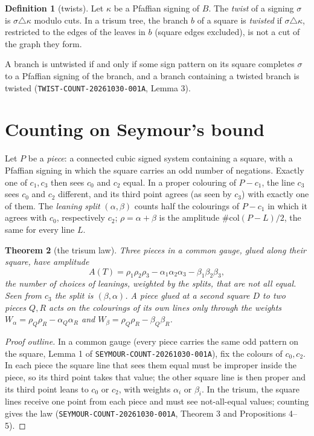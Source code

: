 \documentclass[11pt]{article}
\newtheorem{theorem}{Theorem}
\theoremstyle{definition}
\newtheorem{definition}[theorem]{Definition}
\theoremstyle{remark}
\newcommand{\col}{\#\mathrm{col}}
\begin{document}
\begin{definition}[twists]\label{def:twist}
Let $\kappa$ be a Pfaffian signing of $B$. The \emph{twist} of a signing
$\sigma$ is $\sigma\triangle\kappa$ modulo cuts. In a trisum tree, the branch
$b$ of a square is \emph{twisted} if $\sigma\triangle\kappa$, restricted to the
edges of the leaves in $b$ (square edges excluded), is not a cut of the graph
they form.
\end{definition}
A branch is untwisted if and only if some sign pattern on its square completes
$\sigma$ to a Pfaffian signing of the branch, and a branch containing a
twisted branch is twisted (\texttt{TWIST-COUNT-20261030-001A}, Lemma 3).

\section{Counting on Seymour's bound}\label{sec:A}

Let $P$ be a \emph{piece}: a connected cubic signed system containing a square,
with a Pfaffian signing in which the square carries an odd number of
negations. Exactly one of $c_1,c_3$ then sees $c_0$ and $c_2$ equal. In a proper
colouring of $P-c_1$, the line $c_3$ sees $c_0$ and $c_2$ different, and its
third point agrees (as seen by $c_3$) with exactly one of them. The
\emph{leaning split} $(\alpha,\beta)$ counts half the colourings of $P-c_1$ in
which it agrees with $c_0$, respectively $c_2$; $\rho=\alpha+\beta$ is the
amplitude $\col(P-L)/2$, the same for every line $L$.

\begin{theorem}[the trisum law]\label{thm:law}
Three pieces in a common gauge, glued along their square, have amplitude
\[
A(T)=\rho_1\rho_2\rho_3-\alpha_1\alpha_2\alpha_3-\beta_1\beta_2\beta_3,
\]
the number of choices of leanings, weighted by the splits, that are not all
equal. Seen from $c_3$ the split is $(\beta,\alpha)$. A piece glued at a
second square $D$ to two pieces $Q,R$ acts on the colourings of its own lines
only through the weights $W_\alpha=\rho_Q\rho_R-\alpha_Q\alpha_R$ and
$W_\beta=\rho_Q\rho_R-\beta_Q\beta_R$.
\end{theorem}
\begin{proof}[Proof outline]
In a common gauge (every piece carries the same odd pattern on the square,
Lemma 1 of \texttt{SEYMOUR-COUNT-20261030-001A}), fix the colours of $c_0,c_2$.
In each piece the square line that sees them equal must be improper inside
the piece, so its third point takes that value; the other square line is then
proper and its third point leans to $c_0$ or $c_2$, with weights $\alpha_i$ or
$\beta_i$. In the trisum, the square lines receive one point from each piece
and must see not-all-equal values; counting gives the law
(\texttt{SEYMOUR-COUNT-20261030-001A}, Theorem 3 and Propositions 4--5).
\end{proof}
\end{document}
